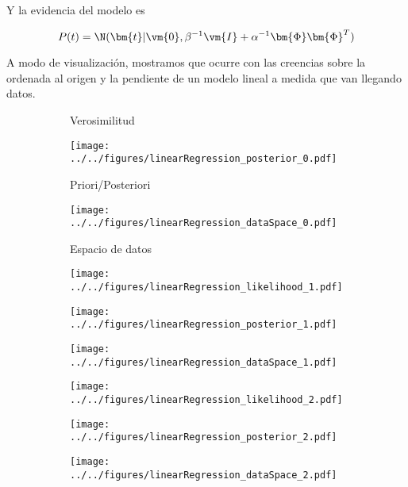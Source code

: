 Y la evidencia del modelo es

\begin{equation}
 P(t) = \N(\bm{t}| \vm{0}, \beta^{-1} \vm{I} + \alpha^{-1}\bm{\Phi}\bm{\Phi}^T  )
\end{equation}

A modo de visualizaci\'on, mostramos que ocurre con las creencias sobre la ordenada al origen y la pendiente de un modelo lineal a medida que van llegando datos.

 \begin{figure}[H]
\begin{subfigure}[t]{0.32\textwidth} 
\caption*{Verosimilitud} 
\end{subfigure}
\begin{subfigure}[t]{0.32\textwidth}
\caption*{Priori/Posteriori} 
\texttt{[image: ../../figures/linearRegression\_posterior\_0.pdf]} 
\end{subfigure}
\begin{subfigure}[t]{0.32\textwidth}
\caption*{Espacio de datos} 
\texttt{[image: ../../figures/linearRegression\_dataSpace\_0.pdf]} 
\end{subfigure}

\begin{subfigure}[c]{0.32\textwidth}
\texttt{[image: ../../figures/linearRegression\_likelihood\_1.pdf]} 
\end{subfigure}
\begin{subfigure}[c]{0.32\textwidth}
\texttt{[image: ../../figures/linearRegression\_posterior\_1.pdf]} 
\end{subfigure}
\begin{subfigure}[c]{0.32\textwidth}
\texttt{[image: ../../figures/linearRegression\_dataSpace\_1.pdf]} 
\end{subfigure}

\begin{subfigure}[c]{0.32\textwidth}
\texttt{[image: ../../figures/linearRegression\_likelihood\_2.pdf]} 
\end{subfigure}
\begin{subfigure}[c]{0.32\textwidth}
\texttt{[image: ../../figures/linearRegression\_posterior\_2.pdf]} 
\end{subfigure}
\begin{subfigure}[c]{0.32\textwidth}
\texttt{[image: ../../figures/linearRegression\_dataSpace\_2.pdf]} 
\end{subfigure}
\end{figure}

